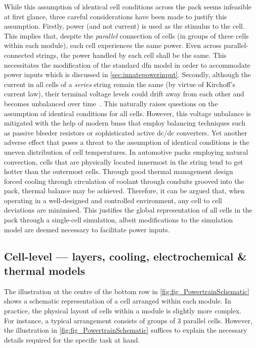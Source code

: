 While  this  assumption of  identical  cell  conditions  across the  pack  seems
infeasible  at first  glance, three  careful  considerations have  been made  to
justify  this assumption.  Firstly,  power  (and not  current)  is  used as  the
stimulus to the cell. This  implies that, despite the \emph{parallel} connection
of cells  (in groups of three  cells within each module),  each cell experiences
the same  power. Even  across parallel-connected strings,  the power  handled by
each cell shall be the same.  This necessitates the modification of the standard
\gls{dfn}  model in  order to  accommodate power  inputs which  is discussed  in
\cref{sec:innatepowerinput}. Secondly,  although the current  in all cells  of a
\emph{series}  string remain  the same  (by virtue  of Kirchoff's  current law),
their  terminal voltage  levels could  drift away  from each  other and  becomes
unbalanced over  time~\cite{Andrea2010}. This naturally raises  questions on the
assumption  of  identical  conditions  for  all  cells.  However,  this  voltage
unbalance is mitigated with the help of modern \glspl{bms} that employ balancing
techniques  such as  passive  bleeder resistors  or  sophisticated active  dc/dc
converters.
Yet another  adverse effect that poses  a threat to the  assumption of identical
conditions is the uneven distribution  of cell temperatures. In automotive packs
employing natural convection, cells that are physically located innermost in the
string  tend to  get  hotter  than the  outermost  cells.  Through good  thermal
management design  \eg{} forced cooling  through circulation of  coolant through
conduits  grooved into  the pack,  thermal balance  may be  achieved. Therefore,
it  can  be argued  that,  when  operating  in  a well-designed  and  controlled
environment,  any cell  to cell  deviations  are minimised.  This justifies  the
global representation of all cells in the pack through a single-cell simulation,
albeit modifications to the simulation  model are deemed necessary to facilitate
power inputs.

\subsection{Cell-level --- layers, cooling, electrochemical \& thermal models}

The    illustration    at     the    centre    of    the     bottom    row    in
\cref{fig:fig_PowertrainSchematic} shows  a schematic  representation of  a cell
arranged within  each module. In practice,  the physical layout of  cells within
a  module  is  slightly  more  complex.  For  instance,  a  typical  arrangement
consists  of  groups   of  3  parallel  cells.  However,   the  illustration  in
\cref{fig:fig_PowertrainSchematic}  suffices to  explain  the necessary  details
required for the specific task at hand.

